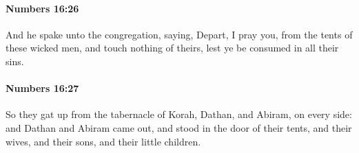 		\paragraph{Numbers 16:26} %
			\label{NUMBERS-16-26}

			And he spake unto the congregation, saying, Depart, I pray you, from the tents of these wicked men, and touch nothing of theirs, lest ye be consumed in all their sins.


		\paragraph{Numbers 16:27} %
			\label{NUMBERS-16-27}

			So they gat up from the tabernacle of Korah, Dathan, and Abiram, on every side: and Dathan and Abiram came out, and stood in the door of their tents, and their wives, and their sons, and their little children.

